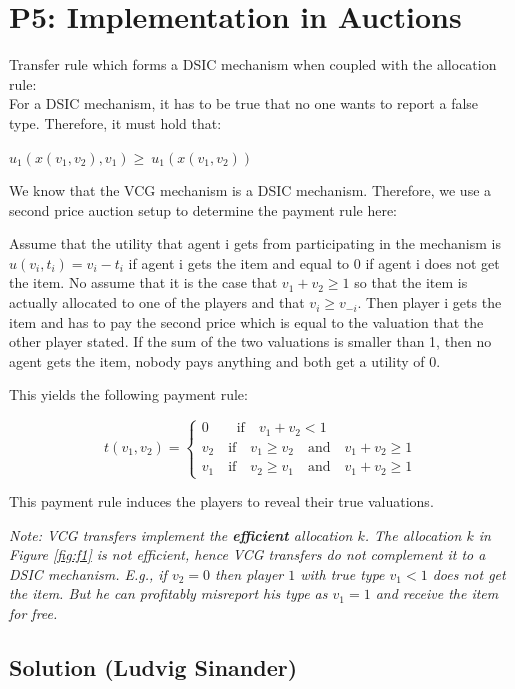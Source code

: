 \documentclass{article}
\newcommand{\enterProblemHeader}[1]{
\nobreak\extramarks{#1}{#1 continued on next page\ldots}\nobreak
\nobreak\extramarks{#1 (continued)}{#1 continued on next page\ldots}\nobreak
}
\newcommand{\exitProblemHeader}[1]{
\nobreak\extramarks{#1 (continued)}{#1 continued on next page\ldots}\nobreak
\nobreak\extramarks{#1}{}\nobreak
}
\newcounter{homeworkProblemCounter} %
\newcommand{\homeworkProblemName}{}
\newenvironment{ex}[1][Problem \arabic{homeworkProblemCounter}]{ %
\stepcounter{homeworkProblemCounter} %
\renewcommand{\homeworkProblemName}{#1} %
\section{\homeworkProblemName} %
}{
}
\begin{document}
\begin{ex}[P5: Implementation in Auctions]
	Transfer rule which forms a DSIC mechanism when coupled with the allocation rule:\\
	
	For a DSIC mechanism, it has to be true that no one wants to report a false type. Therefore, it must hold that:
	
	$u_1(x(v_1,v_2),v_1) \geq\ u_1(x(v_1,v_2))$
	
	We know that the VCG mechanism is a DSIC mechanism. Therefore, we use a second price auction setup to determine the payment rule here:
	
	Assume that the utility that agent i gets from participating in the mechanism is $u(v_i, t_i)=v_i-t_i$ if agent i gets the item and equal to 0 if agent i does not get the item.
	No assume that it is the case that $v_1+v_2 \geq 1$ so that the item is actually allocated to one of the players and that $v_i \geq v_{-i}$. Then player i gets the item and has to pay the second price which is equal to the valuation that the other player stated.
	If the sum of the two valuations is smaller than 1, then no agent gets the item, nobody pays anything and both get a utility of 0.
	
	This yields the following payment rule:
	
	$$t(v_1,v_2)=\begin{cases}
	0 \qquad \text{if} \quad v_{1}+v_{2}<1\\
	v_2 \quad \text{if} \quad v_{1} \geq v_{2} \quad \text{and} \quad v_{1}+v_{2} \geq 1\\
	v_1 \quad \text{if} \quad v_{2} \geq v_{1} \quad \text{and} \quad v_{1}+v_{2} \geq 1 
	\end{cases}$$
	
	This payment rule induces the players to reveal their true valuations.
	
	
	
	\emph{Note: VCG transfers implement the \textbf{efficient} allocation $k$. The allocation $k$ in Figure \ref{fig:f1} is not efficient, hence VCG transfers do not complement it to a DSIC mechanism. E.g., if $v_2=0$ then player $1$ with true type $v_1 < 1$ does not get the item. But he can profitably misreport his type as $v_1=1$ and receive the item for free.}
	
	
	
	\subsection*{Solution (Ludvig Sinander)}


\end{ex}
\end{document}
